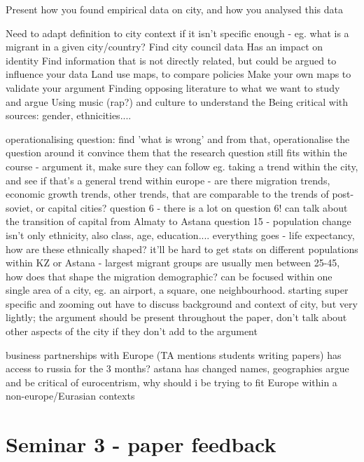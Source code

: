 \documentclass{article}
\begin{document}
Present how you found empirical data on city, and how you analysed this data

\begin{outline}
	\1 Need to adapt definition to city context if it isn't specific enough - eg. what is a migrant in a given city/country?
	\1 Find city council data
	\1 Has an impact on identity
	\1 Find information that is not directly related, but could be argued to influence your data
	\1 Land use maps, to compare policies
	\1 Make your own maps to validate your argument
	\1 Finding opposing literature to what we want to study and argue 
	\1 Using music (rap?) and culture to understand the 
	\1 Being critical with sources: gender, ethnicities.... 

	\1 operationalising question: find 'what is wrong' and from that, operationalise the question around it
\1 convince them that the research question still fits within the course - argument it, make sure they can follow
\1 eg. taking a trend within the city, and see if that's a general trend within europe
	- are there migration trends, economic growth trends, other trends, that are comparable to the trends of post-soviet, or capital cities?
\1 question 6
	- there is a lot on question 6! can talk about the transition of capital from Almaty to Astana
\1 question 15
	- population change isn't only ethnicity, also class, age, education.... everything goes
	- life expectancy, how are these ethnically shaped? it'll be hard to get stats on different populations within KZ or Astana
	- largest migrant groups are usually men between 25-45, how does that shape the migration demographic?
\1 can be focused within one single area of a city, eg. an airport, a square, one neighbourhood. starting super specific and zooming out 
\1 have to discuss background and context of city, but very lightly; the argument should be present throughout the paper, don't talk about other aspects of the city if they don't add to the argument

\1 business partnerships with Europe (TA mentions students writing papers)
\1 has access to russia for the 3 months? 
\1 astana has changed names, geographies 
\1 argue and be critical of eurocentrism, why should i be trying to fit Europe within a non-europe/Eurasian contexts

\end{outline}

\section{Seminar 3 - paper feedback}
\end{document}
